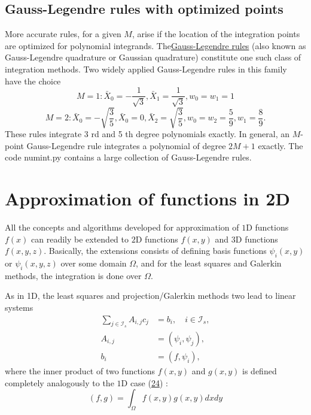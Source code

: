 \documentclass[../main.tex]{subfiles}
\begin{document}
\section[Gauss-Legendre rules with optimized points]{Gauss-Legendre rules with optimized points}
\label{sec:sec_7_2}
More accurate rules, for a given $M$, arise if the location of the integration points are optimized for polynomial integrands. The\href{https://en.wikipedia.org/wiki/Gaussian_quadrature}{Gauss-Legendre rules} (also known as Gauss-Legendre quadrature or Gaussian quadrature) constitute one such class of integration methods. Two widely applied Gauss-Legendre rules in this family have the choice
\begin{equation}\label{eqa104}
	M=1: \bar{X}_{0}=-\frac{1}{\sqrt{3}}, \bar{X}_{1}=\frac{1}{\sqrt{3}}, w_{0}=w_{1}=1
\end{equation}
\begin{equation}\label{eqa105}
	M=2: \bar{X}_{0}=-\sqrt{\frac{3}{5}}, \bar{X}_{0}=0, \bar{X}_{2}=\sqrt{\frac{3}{5}}, w_{0}=w_{2}=\frac{5}{9}, w_{1}=\frac{8}{9}.
\end{equation}
These rules integrate 3 rd and 5 th degree polynomials exactly. In general, an $M$-point Gauss-Legendre rule integrates a polynomial of degree $2 M+1$ exactly. The code numint.py contains a large collection of Gauss-Legendre rules.
\chapter{Approximation of functions in 2D}
\label{chap:chap_8}
\noindent All the concepts and algorithms developed for approximation of $1 \mathrm{D}$ functions $f(x)$ can readily be extended to $2 \mathrm{D}$ functions $f(x, y)$ and $3 \mathrm{D}$ functions $f(x, y, z)$. Basically, the extensions consists of defining basis functions $\psi_{i}(x, y)$ or $\psi_{i}(x, y, z)$ over some domain $\Omega$, and for the least squares and Galerkin methods, the integration is done over $\Omega$.

As in 1D, the least squares and projection/Galerkin methods two lead to linear systems
$$
\begin{aligned}
	\sum_{j \in \mathcal{I}_{s}} A_{i, j} c_{j} &=b_{i}, \quad i \in \mathcal{I}_{s}, \\
	A_{i, j} &=\left(\psi_{i}, \psi_{j}\right), \\
	b_{i} &=\left(f, \psi_{i}\right),
\end{aligned}
$$
where the inner product of two functions $f(x, y)$ and $g(x, y)$ is defined completely analogously to the $1 \mathrm{D}$ case (\hyperref[eqa24]{24}) :
\begin{equation}\label{eqa106}
	(f, g)=\int_{\Omega} f(x, y) g(x, y) d x d y
\end{equation}
\end{document}

